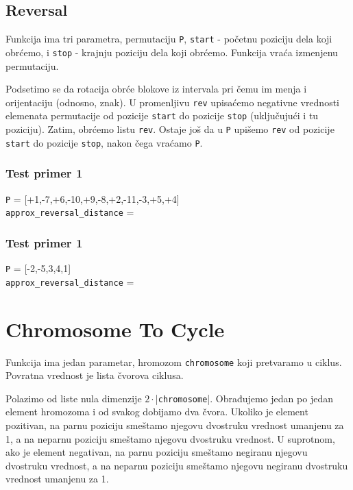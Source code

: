 

\subsection{Reversal}
\label{reversal}

Funkcija ima tri parametra, permutaciju \texttt{P}, \texttt{start} - početnu poziciju dela koji obrćemo, i \texttt{stop} - krajnju poziciju dela koji obrćemo. Funkcija vraća izmenjenu permutaciju.

Podsetimo se da rotacija obrće blokove iz intervala pri čemu im menja i orijentaciju (odnosno, znak). U promenljivu \texttt{rev} upisaćemo negativne vrednosti elemenata permutacije od pozicije \texttt{start} do pozicije \texttt{stop} (uključujući i tu poziciju). Zatim, obrćemo listu \texttt{rev}. Ostaje još da u \texttt{P} upišemo \texttt{rev} od pozicije \texttt{start} do pozicije \texttt{stop}, nakon čega vraćamo \texttt{P}.




\subsubsection{Test primer 1}

\noindent \texttt{P} = [+1,-7,+6,-10,+9,-8,+2,-11,-3,+5,+4]
\\\texttt{approx\_reversal\_distance} =

\subsubsection{Test primer 1}
\noindent \texttt{P} = [-2,-5,3,4,1]
\\\texttt{approx\_reversal\_distance} =


\section{Chromosome To Cycle}
\label{chromToCycle}

Funkcija ima jedan parametar, hromozom \texttt{chromosome} koji pretvaramo u ciklus. Povratna vrednost je lista čvorova ciklusa.

Polazimo od liste nula dimenzije $2\cdot$|\texttt{chromosome}|. Obrađujemo jedan po jedan element hromozoma i od svakog dobijamo dva čvora. Ukoliko je element pozitivan, na parnu poziciju smeštamo njegovu dvostruku vrednost umanjenu za 1, a na neparnu poziciju smeštamo njegovu dvostruku vrednost. U suprotnom, ako je element negativan, na parnu poziciju smeštamo negiranu njegovu dvostruku vrednost, a na neparnu poziciju smeštamo njegovu negiranu dvostruku vrednost umanjenu za 1.

